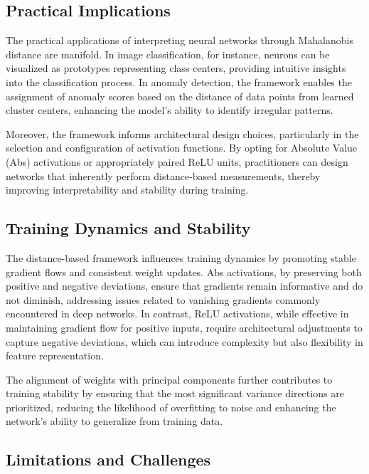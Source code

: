 \subsection{Practical Implications}

The practical applications of interpreting neural networks through Mahalanobis distance are manifold. In image classification, for instance, neurons can be visualized as prototypes representing class centers, providing intuitive insights into the classification process. In anomaly detection, the framework enables the assignment of anomaly scores based on the distance of data points from learned cluster centers, enhancing the model's ability to identify irregular patterns.

Moreover, the framework informs architectural design choices, particularly in the selection and configuration of activation functions. By opting for Absolute Value (Abs) activations or appropriately paired ReLU units, practitioners can design networks that inherently perform distance-based measurements, thereby improving interpretability and stability during training.

\subsection{Training Dynamics and Stability}

The distance-based framework influences training dynamics by promoting stable gradient flows and consistent weight updates. Abs activations, by preserving both positive and negative deviations, ensure that gradients remain informative and do not diminish, addressing issues related to vanishing gradients commonly encountered in deep networks. In contrast, ReLU activations, while effective in maintaining gradient flow for positive inputs, require architectural adjustments to capture negative deviations, which can introduce complexity but also flexibility in feature representation.

The alignment of weights with principal components further contributes to training stability by ensuring that the most significant variance directions are prioritized, reducing the likelihood of overfitting to noise and enhancing the network's ability to generalize from training data.

\subsection{Limitations and Challenges}

